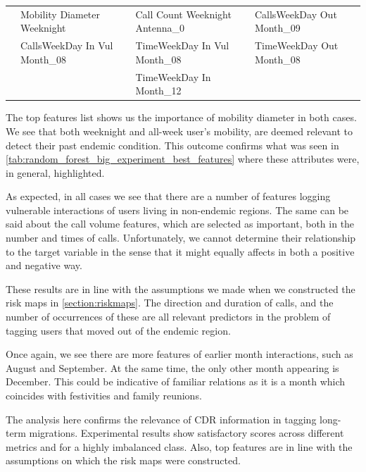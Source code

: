 \begin{table}[ht]
{\begin{tabular}{@{}llll@{}}
            \multicolumn{1}{l|}{}                                   &  Mobility Diameter Weeknight  & Call Count Weeknight Antenna\_0   & CallsWeekDay Out  Month\_09    \\
            \multicolumn{1}{l|}{}                                   &  CallsWeekDay In Vul  Month\_08 &  TimeWeekDay In Vul  Month\_08  &  TimeWeekDay Out  Month\_08  \\
            \multicolumn{1}{l|}{}                                   &   & TimeWeekDay In  Month\_12 &   \\
            \midrule
            \end{tabular}%
    }
\end{table}


The top features list shows us the importance of mobility diameter in both cases.
We see that both weeknight and all-week user's mobility, are deemed relevant to detect their past endemic condition.
This outcome confirms what was seen in \cref{tab:random_forest_big_experiment_best_features} where these attributes were, in general, highlighted.

As expected, in all cases we see that there are a number of features logging vulnerable interactions of users living in non-endemic regions.
The same can be said about the call volume features, which are selected as important, both in the number and times of calls.
Unfortunately, we cannot determine their relationship to the target variable in the sense that it might equally affects in both a positive and negative way.

These results are in line with the assumptions we made when we constructed the risk maps in \cref{section:riskmaps}.
The direction and duration of calls, and the number of occurrences of these are all relevant predictors in the problem of tagging users that moved out of the endemic region.

Once again, we see there are more features of earlier month interactions, such as August and September.
At the same time, the only other month appearing is December.
This could be indicative of familiar relations as it is a month which coincides with festivities and family reunions.


The analysis here confirms the relevance of CDR information in tagging long-term migrations.
Experimental results show satisfactory scores across different metrics and for a highly imbalanced class.
Also, top features are in line with the assumptions on which the risk maps were constructed.


